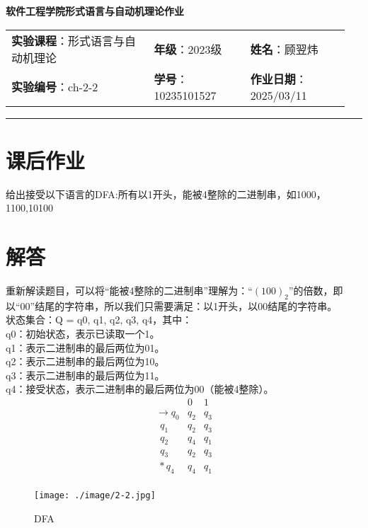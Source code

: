 \documentclass{article}
\begin{document}
	
	\begin{center}
		{\Large{\textbf{\heiti 软件工程学院形式语言与自动机理论作业}}}
		\begin{table}[htb]
			\flushleft
			\begin{tabular}{p{0.4\linewidth}p{0.27\linewidth}p{0.28\linewidth}}\\
				\textbf{实验课程}：形式语言与自动机理论  & \textbf{年级}：2023级       & \textbf{姓名}：顾翌炜  \\
				\textbf{实验编号}：ch-2-2    & \textbf{学号}：10235101527 & \textbf{作业日期}：2025/03/11  \\
			\end{tabular}
		\end{table}
	\end{center}
	\rule{\textwidth}{2pt}
	
	\section*{课后作业}
	
	给出接受以下语言的DFA:所有以1开头，能被4整除的二进制串，如1000，1100,10100
	
	\section*{解答}
	
	重新解读题目，可以将“能被4整除的二进制串”理解为：“$(100)_{2}$”的倍数，即以“00”结尾的字符串，所以我们只需要满足：以1开头，以00结尾的字符串。\\
	
	状态集合：Q = {q0, q1, q2, q3, q4}，其中：\\
	q0：初始状态，表示已读取一个1。\\
	q1：表示二进制串的最后两位为01。\\
	q2：表示二进制串的最后两位为10。\\
	q3：表示二进制串的最后两位为11。\\
	q4：接受状态，表示二进制串的最后两位为00（能被4整除）。\\
	
	\[
	\begin{array}{c|cc}
		& 0 & 1 \\
		\hline
		\to q_0 & q_2 & q_3 \\
		\ \ q_1 & q_2 & q_3 \\
		\ \ q_2 & q_4 & q_1 \\
		\ \ q_3 & q_2 & q_3 \\
		\ * q_4 & q_4 & q_1 \\
	\end{array}
	\]
	
	\begin{figure}[H]
		\centering
		\texttt{[image: ./image/2-2.jpg]}
		\caption{DFA}
	\end{figure}
	
\end{document}
